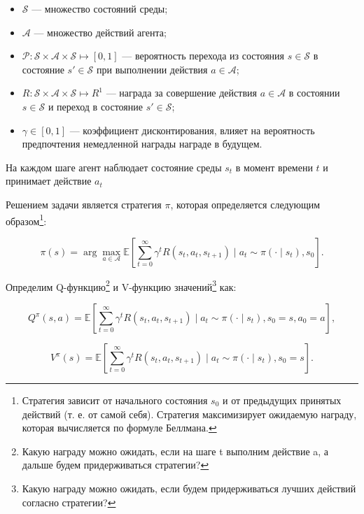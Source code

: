 \begin{itemize}[label=---]
	\item \(\mathcal{S}\) --- множество состояний среды;
	\item \( \mathcal{A} \) --- множество действий агента;
	\item \( \mathcal{P}: \mathcal{S} \times \mathcal{A} \times \mathcal{S} \mapsto [0, 1] \) --- вероятность перехода из состояния \( s \in \mathcal{S} \) в состояние \( s' \in \mathcal{S} \) при выполнении действия \( a \in \mathcal{A} \);
	\item \( R: \mathcal{S} \times \mathcal{A} \times \mathcal{S} \mapsto R^1 \) --- награда за совершение действия \( a \in \mathcal{A} \) в состоянии \( s \in \mathcal{S} \) и переход в состояние \( s' \in \mathcal{S} \);  
	\item \( \gamma \in [0, 1] \) --- коэффициент дисконтирования, влияет на вероятность предпочтения немедленной награды награде в будущем.
\end{itemize}

На каждом шаге агент наблюдает состояние среды \(s_t\) в момент времени \(t\) и принимает действие \(a_t\)

Решением задачи является стратегия \( \pi \), которая определяется следующим образом\footnote{Стратегия зависит от начального состояния \(s_0\) и от предыдущих принятых действий (т. е. от самой себя). Стратегия максимизирует ожидаемую награду, которая вычисляется по формуле Беллмана.}:

\begin{equation}
	\pi(s) = \arg\max_{a \in \mathcal{A}} \mathbb{E} \left[ \sum_{t=0}^{\infty} \gamma^t R(s_t, a_t, s_{t+1}) \mid a_t \sim \pi(\cdot \mid s_t), s_0 \right].
	\label{eq:Q}
\end{equation}


Определим Q-функцию\footnote{Какую награду можно ожидать, если на шаге t выполним действие a, а дальше будем придерживаться стратегии?} и V-функцию значений\footnote{Какую награду можно ожидать, если будем придерживаться лучших действий согласно стратегии?} как:

\begin{equation}
	Q^{\pi}(s, a) = \mathbb{E} \left[ \sum_{t=0}^{\infty} \gamma^t R(s_t, a_t, s_{t+1}) \mid a_t \sim \pi(\cdot \mid s_t), s_0 = s, a_0 = a \right],
	\label{eq:V}
\end{equation}


\begin{equation}
	V^{\pi}(s) = \mathbb{E} \left[ \sum_{t=0}^{\infty} \gamma^t R(s_t, a_t, s_{t+1}) \mid a_t \sim \pi(\cdot \mid s_t), s_0 = s \right].
\end{equation}

